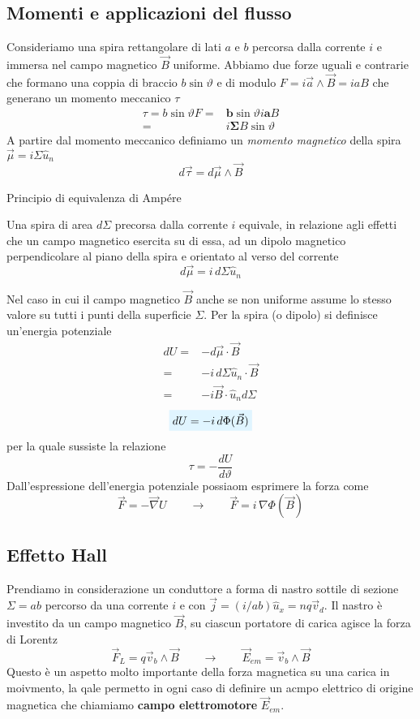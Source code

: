 \documentclass[x11names]{report}
\newcommand{\teorema}[2]{
	\begin{center}
		\fboxsep11pt
		\colorbox{myred}{\begin{minipage}{5.75in}
				\begin{redes}{#1}
					#2
				\end{redes}
		\end{minipage}}
	\end{center}
}
\newcommand{\viola}[1]{%
	\colorbox{myblue}{$\displaystyle #1$}
}
\begin{document}
\subsection{Momenti e applicazioni del flusso}
Consideriamo una spira rettangolare di lati \(a\) e \(b\) percorsa dalla corrente \(i\) e immersa nel campo magnetico \(\vec{B}\) uniforme. Abbiamo due forze uguali e contrarie che formano una coppia di braccio \(b\sin\vartheta\) e di modulo \(F = i \vec{a}\wedge\vec{B} = i a B\) che generano un momento meccanico \(\tau\)
\begin{align*}
	\tau = b\sin\vartheta F =& \boldsymbol{b}\sin\vartheta i \boldsymbol{a} B \\
	                     =& i\boldsymbol{\Sigma}B\sin\vartheta
\end{align*}
A partire dal momento meccanico definiamo un \textit{momento magnetico} della spira \(\vec{\mu} = i\Sigma\hat{u}_n\)
\[
d\vec{\tau} = d\vec{\mu}\wedge\vec{B}
\]

\teorema{Principio di equivalenza di Ampére}{
Una spira di area \(d\Sigma\) precorsa dalla corrente \(i\) equivale, in relazione agli effetti che un campo magnetico esercita su di essa, ad un dipolo magnetico perpendicolare al piano della spira e orientato al verso del corrente
\begin{equation}
	d\vec{\mu} = i \, d\Sigma \hat{u}_n
\end{equation}}
Nel caso in cui il campo magnetico \(\vec{B}\) anche se non uniforme assume lo stesso valore su tutti i punti della superficie \(\Sigma\). Per la spira (o dipolo) si definisce un'energia potenziale
\begin{align*}
	dU =& -d\vec{\mu}\cdot\vec{B} \\
	   =& -i \, d\Sigma \hat{u}_n \cdot \vec{B} \\
	   =& -i\vec{B}\cdot \hat{u}_n  d\Sigma
\end{align*}
\begin{equation}
	\viola{dU =-i \, d\Phi(\vec{B})}
\end{equation}
per la quale sussiste la relazione
\[
\tau= - \frac{dU}{d\vartheta}
\]
Dall'espressione dell'energia potenziale possiaom esprimere la forza come 
\[
\vec{F} = -\vec{\nabla} U \qquad  \to \qquad \vec{F} = i \, \nabla\Phi(\vec{B})
\]
\subsection{Effetto Hall}
Prendiamo in considerazione un conduttore a forma di nastro sottile di sezione \(\Sigma = ab\) percorso da una corrente \(i\) e con \(\vec{j} = (i/ab) \hat{u}_x = nq\vec{v}_d\). Il nastro è investito da un campo magnetico \(\vec{B}\), su ciascun portatore di carica agisce la forza di Lorentz
\[
\vec{F}_L = q\vec{v}_b \wedge \vec{B} \qquad \to \qquad \vec{E}_{em} = \vec{v}_b \wedge \vec{B}
\]
Questo è un aspetto molto importante della forza magnetica su una carica in moivmento, la qale permetto in ogni caso di definire un acmpo elettrico di origine magnetica che chiamiamo \textbf{campo elettromotore} \(\vec{E}_{em}\).
\end{document}
